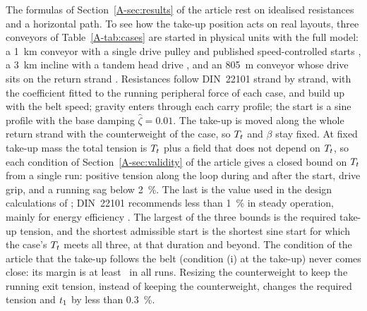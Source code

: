 The formulas of Section~\ref{A-sec:results} of the article rest on idealised resistances and a
horizontal path. To see how the take-up position acts on real layouts, three conveyors of
Table~\ref{A-tab:cases} are started in physical units with the full model: a
\qty{1}{\kilo\metre} conveyor with a single drive pulley and published speed-controlled starts
\citep[\S8.6.2]{lodewijks1996}, a \qty{3}{\kilo\metre} incline with a tandem head drive
\citep{suchorab2025longdistance}, and an \qty{805}{\metre} conveyor whose drive sits on the
return strand \citep{surtees1995runback}. Resistances follow DIN~22101 strand by strand, with
the coefficient fitted to the running peripheral force of each case, and build up with the belt
speed; gravity enters through each carry profile; the start is a sine profile with the base
damping $\hat\zeta=0.01$. The take-up is moved along the whole return strand with the
counterweight of the case, so $T_t$ and $\beta$ stay fixed. At fixed take-up mass the total
tension is $T_t$ plus a field that does not depend on $T_t$, so each condition of
Section~\ref{A-sec:validity} of the article gives a closed bound on $T_t$ from a single run:
positive tension along the loop during and after the start, drive grip, and a running sag below
\qty{2}{\percent}. The last is the value used in the design calculations of
\citet{surtees1995runback}; DIN~22101 recommends less than \qty{1}{\percent} in steady
operation, mainly for energy efficiency \citep[\S8.2.3]{din22101}. The largest of the three
bounds is the required take-up tension, and the shortest admissible start is the shortest sine
start for which the case's $T_t$ meets all three, at that duration and beyond. The condition of
the article that the take-up follows the belt (condition (i) at the take-up) never comes close: its margin is at
least \NumAppAccelMarginMin\ in all runs. Resizing the counterweight to keep the running exit
tension, instead of keeping the counterweight, changes the required tension and $t_{1}$ by
less than \qty{0.3}{\percent}.

